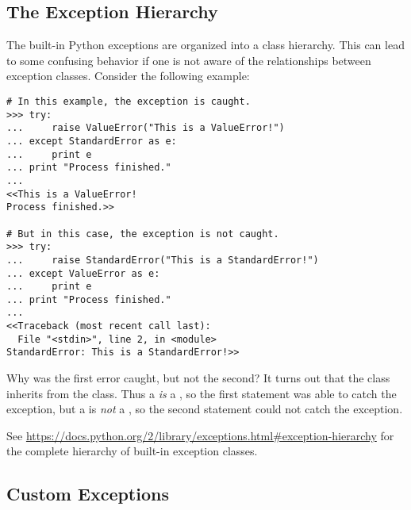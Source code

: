 \begin{comment}
\subsection*{Chaining Exceptions}
\begin{lstlisting}
>>> try:
>>>     raise ValueError("First Exception")
>>> except ValueError as e:
>>>     raise ZeroDivisionError("Second Exception") from e
\end{lstlisting}
\end{comment}

\subsection*{The Exception Hierarchy}

The built-in Python exceptions are organized into a class hierarchy.
This can lead to some confusing behavior if one is not aware of the relationships between exception classes.
Consider the following example:

\begin{lstlisting}
# In this example, the exception is caught.
>>> try:
...     raise ValueError("This is a ValueError!")
... except StandardError as e:
...     print e
... print "Process finished."
...
<<This is a ValueError!
Process finished.>>

# But in this case, the exception is not caught.
>>> try:
...     raise StandardError("This is a StandardError!")
... except ValueError as e:
...     print e
... print "Process finished."
...
<<Traceback (most recent call last):
  File "<stdin>", line 2, in <module>
StandardError: This is a StandardError!>>
\end{lstlisting}

Why was the first error caught, but not the second?
It turns out that the  class inherits from the  class.
Thus a  \emph{is} a , so the first  statement was able to catch the exception, but a  is \emph{not} a , so the second  statement could not catch the exception.

See \url{https://docs.python.org/2/library/exceptions.html#exception-hierarchy} for the complete hierarchy of built-in exception classes.

\subsection*{Custom Exceptions}


